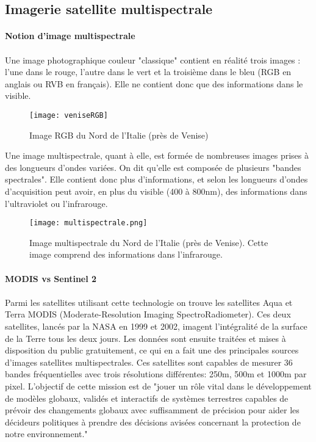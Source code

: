 \subsection{Imagerie satellite multispectrale}

\paragraph{Notion d'image multispectrale}
\paragraph{}
Une image photographique couleur "classique" contient en réalité trois images : l'une dans le rouge, l'autre dans le vert et la troisième dans le bleu (RGB en anglais ou RVB en français). Elle ne contient donc que des informations dans le visible. 
\begin{figure}[H]
  \centering
    \texttt{[image: veniseRGB]}
  \caption{Image RGB du Nord de l'Italie (près de Venise)}
  \label{fig:veniseRGB}
\end{figure}

Une image multispectrale, quant à elle, est formée de nombreuses images prises à des longueurs d'ondes variées. On dit qu'elle est composée de plusieurs "bandes spectrales". Elle contient donc plus d'informations, et selon les longueurs d'ondes d'acquisition peut avoir, en plus du visible (400 à 800nm), des informations dans l'ultraviolet ou l'infrarouge.

\begin{figure}[H]
  \centering
    \texttt{[image: multispectrale.png]}
  \caption{Image multispectrale du Nord de l'Italie (près de Venise). Cette image comprend des informations dans l'infrarouge.}
  \label{fig:veniseMulti}
\end{figure}

\paragraph{MODIS vs Sentinel 2}
\paragraph{}
Parmi les satellites utilisant cette technologie on trouve les satellites Aqua et Terra MODIS (Moderate-Resolution Imaging SpectroRadiometer). Ces deux satellites, lancés par la NASA en 1999 et 2002, imagent l'intégralité de la surface de la Terre tous les deux jours. Les données sont ensuite traitées et mises à disposition du public gratuitement, ce qui en a fait une des principales sources d'images satellites multispectrales. Ces satellites sont capables de mesurer 36 bandes fréquentielles avec trois résolutions différentes: 250m, 500m et 1000m par pixel. L'objectif de cette mission est de "jouer un rôle vital dans le développement de modèles globaux, validés et interactifs de systèmes terrestres capables de prévoir des changements globaux avec suffisamment de précision pour aider les décideurs politiques à prendre des décisions avisées concernant la protection de notre environnement."\cite{nasa}

